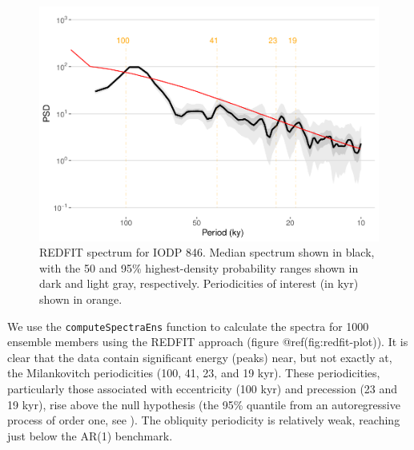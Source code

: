 \documentclass[gchron, manuscript]{copernicus}
\begin{document}
\begin{figure}
\includegraphics[width=12cm]{geoChronR-paper_files/figure-latex/redfit-plot-1} \caption{REDFIT spectrum for IODP 846. Median spectrum shown in black, with the 50 and 95\% highest-density probability ranges shown in dark and light gray, respectively. Periodicities of interest (in kyr) shown in orange.}\label{fig:redfit-plot}
\end{figure}

We use the \texttt{computeSpectraEns} function to calculate the spectra
for 1000 ensemble members using the REDFIT approach (figure
@ref(fig:redfit-plot)). It is clear that the data contain significant
energy (peaks) near, but not exactly at, the Milankovitch periodicities
(100, 41, 23, and 19 kyr). These periodicities, particularly those
associated with eccentricity (100 kyr) and precession (23 and 19 kyr),
rise above the null hypothesis (the 95\% quantile from an autoregressive
process of order one, see \citet{Mudelsee_NPG09}). The obliquity
periodicity is relatively weak, reaching just below the AR(1) benchmark.
\end{document}
